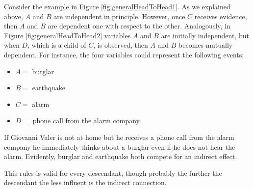 Consider the example in Figure \ref{fig:generalHeadToHead1}. As we explained above, $A$ and $B$ are independent in principle. However, once $C$ receives evidence, then $A$ and $B$ are dependent one with respect to the other. Analogously, in Figure \ref{fig:generalHeadToHead2} variables $A$ and $B$ are initially independent, but when $D$, which is a child of $C$, is observed, then $A$ and $B$ becomes mutually dependent. For instance, the four variables could represent the following events:
\begin{itemize}
    \item $A=$ burglar
    \item $B=$ earthquake
    \item $C=$ alarm
    \item $D=$ phone call from the alarm company
\end{itemize}
If Giovanni Valer is not at home but he receives a phone call from the alarm company he immediately thinks about a burglar even if he does not hear the alarm. Evidently, burglar and earthquake both compete for an indirect effect. \newline

This rules is valid for every descendant, though probably the further the descendant the less influent is the indirect connection.

